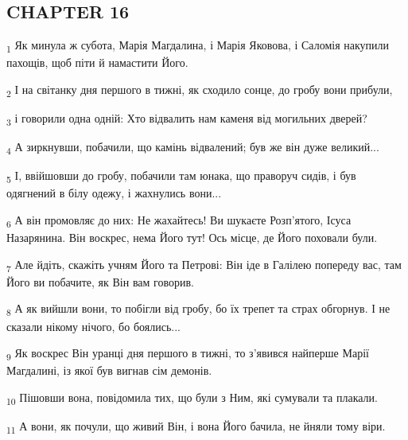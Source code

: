 \subsection{CHAPTER 16}
\begin{tcolorbox}
\textsubscript{1} Як минула ж субота, Марія Магдалина, і Марія Яковова, і Саломія накупили пахощів, щоб піти й намастити Його.
\end{tcolorbox}
\begin{tcolorbox}
\textsubscript{2} І на світанку дня першого в тижні, як сходило сонце, до гробу вони прибули,
\end{tcolorbox}
\begin{tcolorbox}
\textsubscript{3} і говорили одна одній: Хто відвалить нам каменя від могильних дверей?
\end{tcolorbox}
\begin{tcolorbox}
\textsubscript{4} А зиркнувши, побачили, що камінь відвалений; був же він дуже великий...
\end{tcolorbox}
\begin{tcolorbox}
\textsubscript{5} І, ввійшовши до гробу, побачили там юнака, що праворуч сидів, і був одягнений в білу одежу, і жахнулись вони...
\end{tcolorbox}
\begin{tcolorbox}
\textsubscript{6} А він промовляє до них: Не жахайтесь! Ви шукаєте Розп'ятого, Ісуса Назарянина. Він воскрес, нема Його тут! Ось місце, де Його поховали були.
\end{tcolorbox}
\begin{tcolorbox}
\textsubscript{7} Але йдіть, скажіть учням Його та Петрові: Він іде в Галілею попереду вас, там Його ви побачите, як Він вам говорив.
\end{tcolorbox}
\begin{tcolorbox}
\textsubscript{8} А як вийшли вони, то побігли від гробу, бо їх трепет та страх обгорнув. І не сказали нікому нічого, бо боялись...
\end{tcolorbox}
\begin{tcolorbox}
\textsubscript{9} Як воскрес Він уранці дня першого в тижні, то з'явився найперше Марії Магдалині, із якої був вигнав сім демонів.
\end{tcolorbox}
\begin{tcolorbox}
\textsubscript{10} Пішовши вона, повідомила тих, що були з Ним, які сумували та плакали.
\end{tcolorbox}
\begin{tcolorbox}
\textsubscript{11} А вони, як почули, що живий Він, і вона Його бачила, не йняли тому віри.
\end{tcolorbox}
